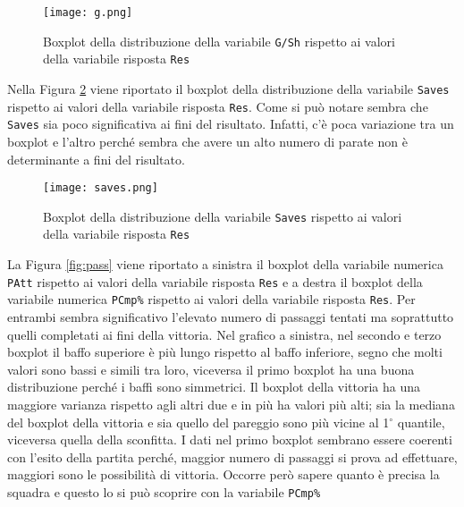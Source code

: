 \begin{figure}[htbp]
	\begin{center}
		\texttt{[image: g.png]}
		\caption{Boxplot della distribuzione della variabile \texttt{G/Sh} rispetto ai valori della variabile risposta \texttt{Res} } \label{fig:g}
	\end{center}
\end{figure}

Nella Figura \ref{fig:saves} viene riportato il boxplot della distribuzione della variabile \texttt{Saves} rispetto ai valori della variabile risposta \texttt{Res}. Come si può notare sembra che \texttt{Saves} sia poco significativa ai fini del risultato. Infatti, c'è poca variazione tra un boxplot e l'altro perché sembra che avere un alto numero di parate non è determinante a fini del risultato.\\

\begin{figure}[htbp]
	\begin{center}
		\texttt{[image: saves.png]}
		\caption{Boxplot della distribuzione della variabile \texttt{Saves} rispetto ai valori della variabile risposta \texttt{Res} } \label{fig:saves}
	\end{center}
\end{figure}

La Figura \ref{fig:pass} viene riportato a sinistra il boxplot della variabile numerica \texttt{PAtt} rispetto ai valori della variabile risposta \texttt{Res} e a destra il boxplot della variabile numerica \texttt{PCmp\%} rispetto ai valori della variabile risposta \texttt{Res}. Per entrambi sembra significativo l'elevato numero di passaggi tentati ma soprattutto quelli completati ai fini della vittoria. Nel grafico a sinistra, nel secondo e terzo boxplot il baffo superiore è più lungo rispetto al baffo inferiore, segno che molti valori sono bassi e simili tra loro, viceversa il primo boxplot ha una buona distribuzione perché i baffi sono simmetrici. Il boxplot della vittoria ha una maggiore varianza rispetto agli altri due e in più ha valori più alti; sia la mediana del boxplot della vittoria e sia quello del pareggio sono più vicine al 1$^{\circ}$ quantile, viceversa quella della sconfitta. I dati nel primo boxplot sembrano essere coerenti con l'esito della partita perché, maggior numero di passaggi si prova ad effettuare, maggiori sono le possibilità di vittoria. Occorre però sapere quanto è precisa la squadra e questo lo si può scoprire con la variabile \texttt{PCmp\%}\\

